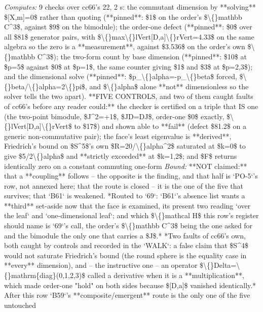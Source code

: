 \begin{description}
\emph{Computes:} 9 checks over cc66's 22, 2 s: the commutant dimension by **solving** \$[X,m]=0\$ rather than quoting (**pinned**: \$1\$ on the order's \$\textbackslash\{\}mathbb C\textasciicircum{}3\$, against \$9\$ on the bimodule); the order-one defect (**pinned**: \$0\$ over all \$81\$ generator pairs, with \$\textbackslash\{\}max\textbackslash\{\}lVert[D,a]\textbackslash\{\}rVert=4.33\$ on the same algebra so the zero is a **measurement**, against \$3.536\$ on the order's own \$\textbackslash\{\}mathbb C\textasciicircum{}3\$); the two-form count by base dimension (**pinned**: \$10\$ at \$p=5\$ against \$0\$ at \$p=1\$, the same counter giving \$1\$ and \$3\$ at \$p=2,3\$); and the dimensional solve (**pinned**: \$p\_\textbackslash\{\}alpha=-p\_\textbackslash\{\}beta\$ forced, \$\textbackslash\{\}beta/\textbackslash\{\}alpha=2\textbackslash\{\}pi\$, and \$\textbackslash\{\}alpha\$ alone **not** dimensionless so the solver tells the two apart). **FIVE CONTROLS, and two of them caught faults of cc66's before any reader could:** the checker is certified on a triple that IS one (the two-point bimodule, \$J\textasciicircum{}2=+1\$, \$JD=DJ\$, order-one \$0\$ exactly, \$\textbackslash\{\}lVert[D,a]\textbackslash\{\}rVert\$ to \$17\$) and shown able to **fail** (defect \$81.2\$ on a generic non-commutative pair); the face's least eigenvalue is **derived**, Friedrich's bound on \$S\textasciicircum{}5\$'s own \$R=20/\textbackslash\{\}alpha\textasciicircum{}2\$ saturated at \$k=0\$ to give \$5/2\textbackslash\{\}alpha\$ and **strictly exceeded** at \$k=1,2\$; and \$F\$ returns identically zero on a constant commuting one-form
 \emph{Bound:} **NOT claimed:** that a **coupling** follows -- the opposite is the finding, and that half is `PO-5`'s row, not annexed here; that the route is closed -- it is the one of the five that survives; that `B61` is weakened.  *Routed to `69`: `B61`'s absence list wants a **third** set-aside now that the face is examined, its present two reading `over the leaf` and `one-dimensional leaf`; and which \$\textbackslash\{\}mathcal H\$ this row's register should name is `69`'s call, the order's \$\textbackslash\{\}mathbb C\textasciicircum{}3\$ being the one asked for and the bimodule the only one that carries a \$J\$.*  *Two faults of cc66's own, both caught by controls and recorded in the `WALK`: a false claim that \$S\textasciicircum{}4\$ would not saturate Friedrich's bound (the round sphere is the equality case in **every** dimension), and -- the instructive one -- an operator \$\textbackslash\{\}Delta=\textbackslash\{\}mathrm\{diag\}(0,1,2,3)\$ called a derivative when it is a **multiplication**, which made order-one "hold" on both sides because \$[D,a]\$ vanished identically.* After this row `B59`'s **composite/emergent** route is the only one of the five untouched

\end{description}
